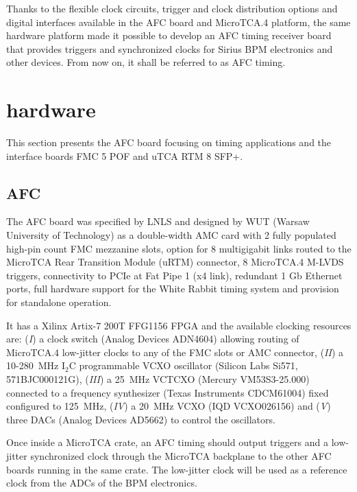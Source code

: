 \documentclass[a4paper,
               biblatex,      %
               ]{jacow}
\begin{document}
Thanks to the flexible clock circuits, trigger and clock distribution options and digital interfaces available in the AFC board and MicroTCA.4 platform, the same hardware platform made it possible to develop an AFC timing receiver board that provides triggers and synchronized clocks for Sirius BPM electronics and other devices. From now on, it shall be referred to as AFC timing. 

\section{hardware}
This section presents the AFC board focusing on timing applications and the interface boards FMC 5 POF and uTCA RTM 8 SFP+.

\subsection{AFC}

The AFC board was specified by LNLS and designed by WUT (Warsaw University of Technology) as a double-width AMC card with 2 fully populated high-pin count FMC mezzanine slots, option for 8 multigigabit links routed to the MicroTCA Rear Transition Module (uRTM) connector, 8 MicroTCA.4 M-LVDS triggers, connectivity to PCIe at Fat Pipe 1 (x4 link), redundant 1 Gb Ethernet ports, full hardware support for the White Rabbit timing system and provision for standalone operation. 

It has a Xilinx Artix-7 200T FFG1156 FPGA and the available clocking resources are: (\textit{I}) a clock switch (Analog Devices ADN4604) allowing routing of MicroTCA.4 low-jitter clocks to any of the FMC slots or AMC connector, (\textit{II}) a 10-280~MHz I$_{2}$C programmable VCXO oscillator (Silicon Labs Si571, 571BJC000121G), (\textit{III}) a 25~MHz VCTCXO (Mercury VM53S3-25.000) connected to a frequency synthesizer (Texas Instruments CDCM61004) fixed configured to 125~MHz, (\textit{IV}) a 20~MHz VCXO (IQD VCXO026156) and (\textit{V}) three DACs (Analog Devices AD5662) to control the oscillators. 

Once inside a MicroTCA crate, an AFC timing should output triggers and a low-jitter synchronized clock through the MicroTCA backplane to the other AFC boards running in the same crate. The low-jitter clock will be used as a reference clock from the ADCs of the BPM electronics.
\end{document}
